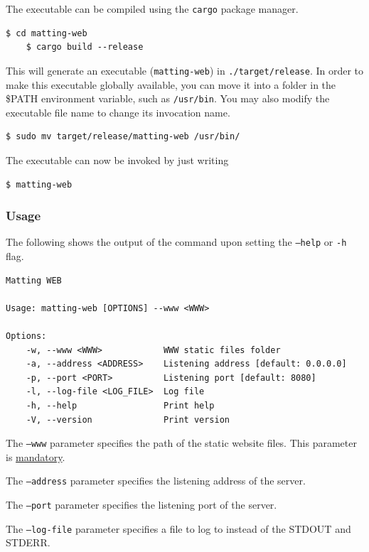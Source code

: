 \documentclass[a4paper]{article}
\begin{document}
The executable can be compiled using the \texttt{cargo}
package manager.

\begin{lstlisting}[style=boxed]
    $ cd matting-web
    $ cargo build --release
\end{lstlisting}

This will generate an executable (\texttt{matting-web})
in \texttt{./target/release}.
In order to make this executable globally available,
you can move it into a folder in the \textsc{\$PATH} environment
variable, such as \texttt{/usr/bin}.
You may also modify the executable file name to change its invocation
name.

\begin{lstlisting}[style=boxed]
    $ sudo mv target/release/matting-web /usr/bin/
\end{lstlisting}

The executable can now be invoked by just writing
\begin{lstlisting}[style=boxed]
    $ matting-web
\end{lstlisting}

\subsubsection{Usage}

The following shows the output of the command upon
setting the \texttt{--help} or \texttt{-h} flag.
\begin{lstlisting}[style=boxed]
Matting WEB

Usage: matting-web [OPTIONS] --www <WWW>

Options:
    -w, --www <WWW>            WWW static files folder
    -a, --address <ADDRESS>    Listening address [default: 0.0.0.0]
    -p, --port <PORT>          Listening port [default: 8080]
    -l, --log-file <LOG_FILE>  Log file
    -h, --help                 Print help
    -V, --version              Print version
\end{lstlisting}

The \texttt{--www} parameter specifies the path
of the static website files.
This parameter is \underline{mandatory}.

The \texttt{--address} parameter specifies the listening
address of the server.

The \texttt{--port} parameter specifies the listening
port of the server.

The \texttt{--log-file} parameter specifies a file to log to instead of the
\textsc{STDOUT} and \textsc{STDERR}.
\end{document}
